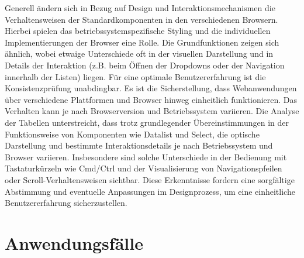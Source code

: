 Generell ändern sich in Bezug auf Design und Interaktionsmechanismen die Verhaltensweisen der Standardkomponenten in den verschiedenen Browsern. 
Hierbei spielen das betriebssystemspezifische Styling und die individuellen Implementierungen der Browser eine Rolle. 
Die Grundfunktionen zeigen sich ähnlich, wobei etwaige Unterschiede oft in der visuellen Darstellung und in Details der Interaktion (z.B. beim Öffnen der Dropdowns oder der Navigation innerhalb der Listen) liegen. 
Für eine optimale Benutzererfahrung ist die Konsistenzprüfung unabdingbar.
Es ist die Sicherstellung, dass Webanwendungen über verschiedene Plattformen und Browser hinweg einheitlich funktionieren. 
Das Verhalten kann je nach Browserversion und Betriebssystem variieren. 
Die Analyse der Tabellen unterstreicht, dass trotz grundlegender Übereinstimmungen in der Funktionsweise von Komponenten wie Datalist und Select, 
die optische Darstellung und bestimmte Interaktionsdetails je nach Betriebssystem und Browser variieren. 
Insbesondere sind solche Unterschiede in der Bedienung mit Tastaturkürzeln wie Cmd/Ctrl und der Visualisierung von Navigationspfeilen oder Scroll-Verhaltensweisen sichtbar. 
Diese Erkenntnisse fordern eine sorgfältige Abstimmung und eventuelle Anpassungen im Designprozess, um eine einheitliche Benutzererfahrung sicherzustellen.


\section{Anwendungsfälle}
\label{sec:useCases}

